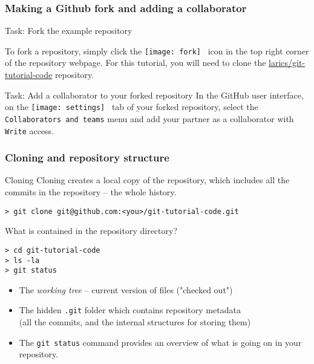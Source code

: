 
\begin{frame}[fragile]

\frametitle{Making a Github fork and adding a collaborator}


\begin{block}{Task: Fork the example repository}

	To fork a repository, simply click the \texttt{[image: fork]} \, icon in the top right corner of the repository webpage. For this tutorial, you will need to clone the \href{https://github.com/larics/git-tutorial-code.git}{larics/git-tutorial-code} repository.
\end{block}

\begin{block}{Task: Add a collaborator to your forked repository}
In the GitHub user interface, on the \texttt{[image: settings]} \, tab of your forked repository, select the \texttt{Collaborators and teams} menu and add your partner as a collaborator with \texttt{Write} access.
\end{block}

\end{frame}


\begin{frame}[fragile]

\frametitle{Cloning and repository structure}

\begin{block}{Cloning}
Cloning creates a local copy of the repository, which includes all the commits in the repository -- the whole history.
\begin{verbatim}
> git clone git@github.com:<you>/git-tutorial-code.git
\end{verbatim}
\end{block}

What is contained in the repository directory?
	
\begin{verbatim}
> cd git-tutorial-code
> ls -la
> git status
\end{verbatim}
	
\begin{itemize}
	\item The \textit{working tree} -- current version of files ("checked out")
	\item The hidden \texttt{.git} folder which contains repository metadata \\ (all the commits, and the internal structures for storing them)
	\item The \texttt{git status} command provides an overview of what is going on in your repository.
\end{itemize}
\begin{verbatim}
\end{verbatim}
	
\end{frame}


